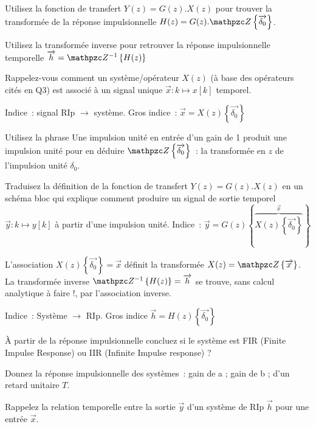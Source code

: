 
Utilisez la fonction de transfert $Y(z) = G(z) . X(z)$ pour trouver la
transformée de la réponse impulsionnelle
$H(z) = G(z) . \tZde{\vec{\delta_0}}$.

Utilisez la transformée inverse pour retrouver la réponse
impulsionnelle temporelle $\vec{h} = \tZiDe{H(z)}$

\begin{remarque}
  Rappelez-vous comment un système/opérateur $X(z)$ (à base des
  opérateurs cités en Q3) est associé à un signal unique
  $\vec{x}: k\mapsto x[k]$ temporel.

  Indice~: signal RIp $\to$ système. Gros indice~:
  $\vec{x}=X (z)\!\left\{\vec{\delta_0}\right\}$

  Utilisez la phrase \og{}Une impulsion unité en entrée d'un gain de 1
  produit une impulsion unité\fg{} pour en déduire $\tZde{\vec{\delta_0}}$~: la transformée en
  $z$ de l'impulsion unité $\delta_0$.

  Traduisez la définition de la fonction de transfert
  $Y(z) = G(z) . X(z)$ en un schéma bloc qui explique comment
  produire un signal de sortie temporel $\vec{y}: k \mapsto y[k]$ à
  partir d'une impulsion unité. Indice~:
  $\vec{y}=G(z)\left\{\overbrace{ X(z)\!\left\{ \vec{\delta_0} \right\}}^{\vec{x}} \right\}$

  L'association $X (z)\!\left\{\vec{\delta_0}\right\}=\vec{x}$ définit
  la transformée $X(z) = \tZde{\vec{x}}$. La transformée inverse $\tZiDe{H(z)}=\vec{h}$
  se trouve, sans calcul analytique à faire !, par l'association inverse.

  Indice~: Système  $\to$ RIp. Gros indice $\vec{h} = H(z)\!\left\{\vec{\delta_0}\right\}$

\end{remarque}

À partir de la réponse impulsionnelle concluez si le système est
FIR (Finite Impulse Response) ou IIR (Infinite Impulse response) ?


 

Donnez la réponse impulsionnelle des systèmes~: \og{} gain de a\fg{} ; \og{} gain de b\fg{} ; d'un retard unitaire $T$.

Rappelez la relation temporelle entre la sortie $\vec{y}$ d'un système de RIp $\vec{h}$ pour une entrée $\vec{x}$.

